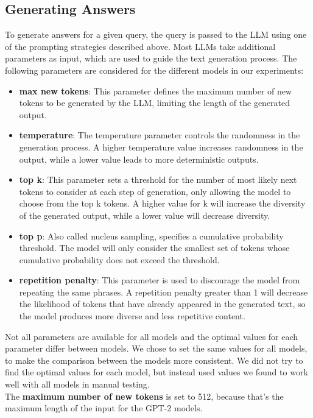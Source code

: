 \subsection{Generating Answers}
To generate answers for a given query, the query is passed to the LLM using one of the prompting strategies described above.
Most LLMs take additional parameters as input, which are used to guide the text generation process.
The following parameters are considered for the different models in our experiments:
\begin{itemize}
    \item \textbf{max new tokens}: This parameter defines the maximum number of new tokens to be generated by the LLM, limiting the length of the generated output.
    \item \textbf{temperature}: The temperature parameter controls the randomness in the generation process. A higher temperature value increases randomness in the output, while a lower value leads to more deterministic outputs.
    \item \textbf{top k}: This parameter sets a threshold for the number of most likely next tokens to consider at each step of generation, only allowing the model to choose from the top k tokens. A higher value for k will increase the diversity of the generated output, while a lower value will decrease diversity.
    \item \textbf{top p}:  Also called nucleus sampling, specifies a cumulative probability threshold. The model will only consider the smallest set of tokens whose cumulative probability does not exceed the threshold.
    \item \textbf{repetition penalty}: This parameter is used to discourage the model from repeating the same phrases. A repetition penalty greater than 1 will decrease the likelihood of tokens that have already appeared in the generated text, so the model produces more diverse and less repetitive content.
\end{itemize}
Not all parameters are available for all models and the optimal values for each parameter differ between models.
We chose to set the same values for all models, to make the comparison between the models more consistent.
We did not try to find the optimal values for each model, but instead used values we found to work well with all models in manual testing.
\\
The \textbf{maximum number of new tokens} is set to 512, because that's the maximum length of the input for the GPT-2 models.
\\
